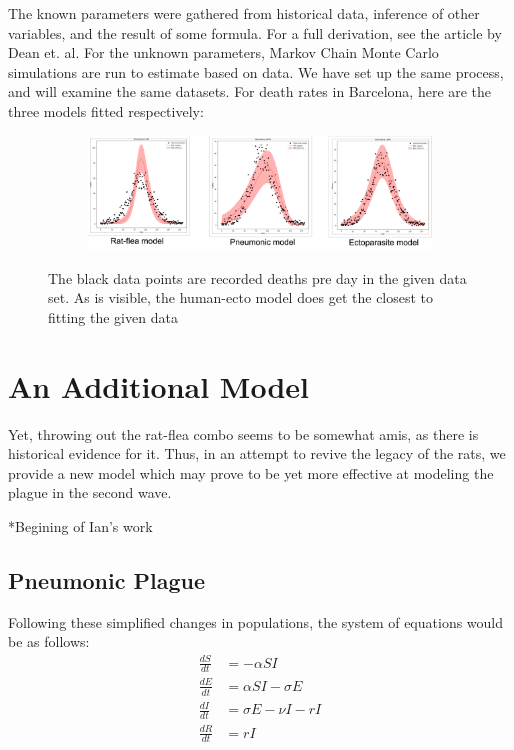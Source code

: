 \documentclass [letterpaper, 12pt] {article}
\begin{document}
The known parameters were gathered from historical data, inference of other variables, and the result of some formula. For a full derivation, see the article by Dean et. al. \cite[p.~3-4]{Dean1304}
For the unknown parameters, Markov Chain Monte Carlo simulations are run to estimate based on data. We have set up the same process, and will examine the same datasets. For death rates in Barcelona, here are the three models fitted respectively:

\begin{figure}[h!]
	\begin{subfigure}{1\textwidth}
		\includegraphics[width=\linewidth]{Figures/models1.png}
	\end{subfigure}\hspace{\fill}
	\caption{The black data points are recorded deaths pre day in the given data set. As is visible, the human-ecto model does get the closest to fitting the given data} 
\end{figure}

\pagebreak

\section {An Additional Model}

Yet, throwing out the rat-flea combo seems to be somewhat amis, as there is historical evidence for it. Thus, in an attempt to revive the legacy of the rats, we provide a new model which may prove to be yet more effective at modeling the plague in the second wave.

*Begining of Ian's work

\subsection {Pneumonic Plague}

Following these simplified changes in
populations, the system of equations would be as follows:
\begin{align} 
	\frac{dS}{dt}  &=  -\alpha SI \\ 
	\frac{dE}{dt}  &=  \alpha SI - \sigma E \\
	\frac{dI}{dt}  &=  \sigma E - \nu I - rI \\
	\frac{dR}{dt} &= rI
\end{align}
\end{document}
